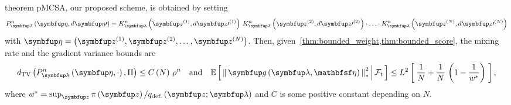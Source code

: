
\begin{theoremEnd}{theorem}\label{thm:pmcsa}
  pMCSA, our proposed scheme, is obtained by setting
  {\small
  \begin{align*}
    P_{\vlambda}^n\left(\veta, d\veta\prime\right)
    = 
    K_{\vlambda}^n\left(\vz^{(1)}, d\vz\prime^{(1)}\right)
    \,
    K_{\vlambda}^n\left(\vz^{(2)}, d\vz\prime^{(2)}\right)
    \cdot
    \ldots 
    \cdot
    K_{\vlambda}^n\left(\vz^{(N)}, d\vz\prime^{(N)}\right)
  \end{align*}
  }
  with \(\veta = \left(\vz^{(1)}, \vz^{(2)}, \ldots, \vz^{(N)}\right)\).
  Then, given~\cref{thm:bounded_weight,thm:bounded_score}, the mixing rate and the gradient variance bounds are
  {\small
  \begin{align*}
    \DTV{P_{\vlambda}^n\left(\veta, \cdot\right)}{\Pi}
    \leq
    C\left(N\right)\,{\rho^n}
    \quad\text{and}\quad
    \E{ \norm{ \vg\left(\vlambda, \rvveta\right) }^2_{*} \,\middle|\, \mathcal{F}_{t} }
    \leq
    L^2 \left[\; \frac{1}{N} + \frac{1}{N}\,\left(1 - \frac{1}{w^*}\right) \;\right],
  \end{align*}
  }
  where \(w^* = \sup_{\vz} \pi\left(\vz\right) / q_{\text{def.}}\left(\vz;\vlambda\right)\) and \(C\) is some positive constant depending on \(N\).
\end{theoremEnd}
